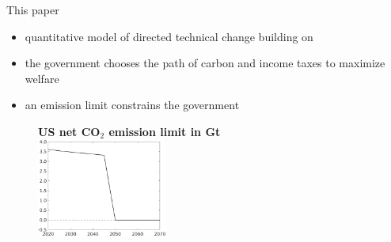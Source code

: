 \documentclass[11pt,aspectratio=169]{beamer}
\begin{document}
\begin{frame}{This paper}
	\vspace{-2mm}
	\begin{itemize}
		\item<+-> quantitative model of \alert{directed technical change} building on \cite{Fried2018ClimateAnalysis}
		\vspace{2mm}
		\item<+->   the government   chooses the \alert{path of carbon and income taxes} to maximize welfare\vspace{2mm}
		\item<+-> an \alert{emission limit} constrains the government
	\end{itemize}
	\pause
	\begin{center}
		\begin{figure}
			\centering
			\textbf{US net CO$_2$ emission limit in Gt}\\
			\vspace{2mm}	\includegraphics[width=0.38\textwidth]{../codding_model/own_basedOnFried/optimalPol_010922_revision/figures/all_13Sept22_Tplus30/Emnet.png}
		\end{figure}
	\end{center}
\end{frame}
\end{document}
